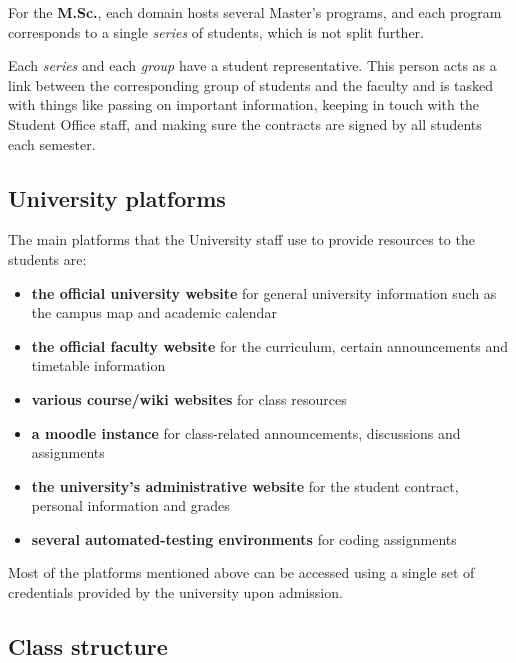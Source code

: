         For the \textbf{M.Sc.}, each domain hosts several Master's programs, and each program corresponds to a single \textit{series} of students, which is not split further.
        
        Each \textit{series} and each \textit{group} have a student representative. This person acts as a link between the corresponding group of students and the faculty and is tasked with things like passing on important information, keeping in touch with the Student Office staff, and making sure the contracts are signed by all students each semester.
    
    \subsection{University platforms} \label{1:university_platforms}
    
        The main platforms that the University staff use to provide resources to the students are:
        
        \begin{itemize}
            \setlength{\topsep}{0.5pt}
            \setlength{\itemsep}{0.5pt}
            \setlength{\parsep}{0.5pt}
            \item \textbf{the official university website} for general university information such as the campus map and academic calendar
            \item \textbf{the official faculty website} for the curriculum, certain announcements and timetable information
            \item \textbf{various course/wiki websites} for class resources
            \item \textbf{a \gls{moodle} instance} for class-related announcements, discussions and assignments
            \item \textbf{the university's administrative website} for the student contract, personal information and grades
            \item \textbf{several automated-testing environments} for coding assignments
        \end{itemize}
    
        Most of the platforms mentioned above can be accessed using a single set of credentials provided by the university upon admission.
        
    \subsection{Class structure} \label{1:class_structure}
    
